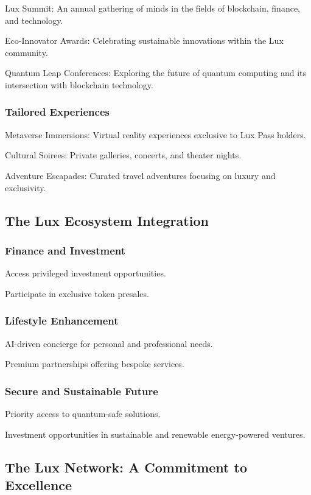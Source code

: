 \documentclass[11pt]{article}
\begin{document}
Lux Summit: An annual gathering of minds in the fields of blockchain, finance, and technology.


Eco-Innovator Awards: Celebrating sustainable innovations within the Lux community.


Quantum Leap Conferences: Exploring the future of quantum computing and its intersection with blockchain technology.


\subsubsection{Tailored Experiences}

Metaverse Immersions: Virtual reality experiences exclusive to Lux Pass holders.


Cultural Soirees: Private galleries, concerts, and theater nights.


Adventure Escapades: Curated travel adventures focusing on luxury and exclusivity.


\subsection{The Lux Ecosystem Integration}

\subsubsection{Finance and Investment}

Access privileged investment opportunities.


Participate in exclusive token presales.


\subsubsection{Lifestyle Enhancement}

AI-driven concierge for personal and professional needs.


Premium partnerships offering bespoke services.


\subsubsection{Secure and Sustainable Future}

Priority access to quantum-safe solutions.


Investment opportunities in sustainable and renewable energy-powered ventures.


\subsection{The Lux Network: A Commitment to Excellence}
\end{document}
